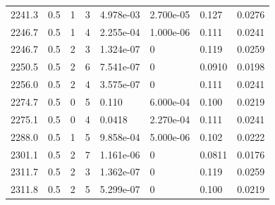 \documentclass[preview]{standalone}
\begin{document}
{{{{{\begin{tabular}{L{1.2cm}C{1.2cm} C{0.3cm}C{0.5cm} C{1.4cm}C{1.4cm} C{1.4cm}C{1.4cm}}
  2241.3  &   0.5  & 1     &  3 &  4.978e-03  & 2.700e-05  & 0.127 &  0.0276   \\ 
  2246.7  &   0.5  & 1     &  4 &  2.255e-04  & 1.000e-06  & 0.111 &  0.0241   \\ 
  2246.7  &   0.5  & 2     &  3 &  1.324e-07  & 0  & 0.119 &  0.0259   \\ 
  2250.5  &   0.5  & 2     &  6 &  7.541e-07  & 0  & 0.0910 &  0.0198   \\ 
  2256.0  &   0.5  & 2     &  4 &  3.575e-07  & 0  & 0.111 &  0.0241   \\ 
  2274.7  &   0.5  & 0     &  5 &  0.110  & 6.000e-04  & 0.100 &  0.0219   \\ 
  2275.1  &   0.5  & 0     &  4 &  0.0418  & 2.270e-04  & 0.111 &  0.0241   \\ 
  2288.0  &   0.5  & 1     &  5 &  9.858e-04  & 5.000e-06  & 0.102 &  0.0222   \\ 
  2301.1  &   0.5  & 2     &  7 &  1.161e-06  & 0  & 0.0811 &  0.0176   \\ 
  2311.7  &   0.5  & 2     &  3 &  1.362e-07  & 0  & 0.119 &  0.0259   \\ 
  2311.8  &   0.5  & 2     &  5 &  5.299e-07  & 0  & 0.100 &  0.0219   \\ 
\hline 
\end{tabular} 

}}}}}
\end{document}
